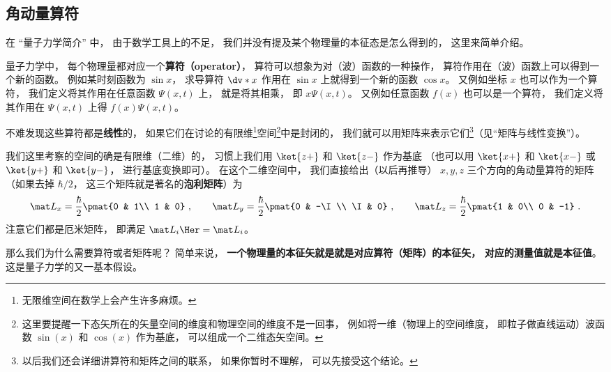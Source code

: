 {


\subsection{角动量算符}
在 “量子力学简介” 中， 由于数学工具上的不足， 我们并没有提及某个物理量的本征态是怎么得到的， 这里来简单介绍。

量子力学中， 每个物理量都对应一个\textbf{算符（operator）}， 算符可以想象为对（波）函数的一种操作， 算符作用在（波）函数上可以得到一个新的函数。 例如某时刻函数为 $\sin x$， 求导算符 $\dv*{x}$ 作用在 $\sin x$ 上就得到一个新的函数 $\cos x$。 又例如坐标 $x$ 也可以作为一个算符， 我们定义将其作用在任意函数 $\Psi(x, t)$ 上， 就是将其相乘， 即 $x\Psi(x, t)$。 又例如任意函数 $f(x)$ 也可以是一个算符， 我们定义将其作用在 $\Psi(x, t)$ 上得 $f(x)\Psi(x, t)$。

不难发现这些算符都是\textbf{线性}的， 如果它们在讨论的有限维\footnote{无限维空间在数学上会产生许多麻烦。}空间\footnote{这里要提醒一下态矢所在的矢量空间的维度和物理空间的维度不是一回事， 例如将一维（物理上的空间维度， 即粒子做直线运动）波函数 $\sin(x)$ 和 $\cos(x)$ 作为基底， 可以组成一个二维态矢空间。}中是封闭的， 我们就可以用矩阵来表示它们\footnote{以后我们还会详细讲算符和矩阵之间的联系， 如果你暂时不理解， 可以先接受这个结论。}（见“矩阵与线性变换”）。%

我们这里考察的空间的确是有限维（二维）的， 习惯上我们用 $\ket{z+}$ 和 $\ket{z-}$ 作为基底 （也可以用 $\ket{x+}$ 和 $\ket{x-}$ 或 $\ket{y+}$ 和 $\ket{y-}$， 进行基底变换即可）。 在这个二维空间中， 我们直接给出（以后再推导） $x, y, z$ 三个方向的角动量算符的矩阵（如果去掉 $\hbar/2$， 这三个矩阵就是著名的\textbf{泡利矩阵}）为
\begin{equation}
\mat L_x = \frac{\hbar}{2}\pmat{0 & 1\\ 1 & 0}~,
\qquad
\mat L_y = \frac{\hbar}{2}\pmat{0 & -\I \\ \I & 0}~,
\qquad
\mat L_z = \frac{\hbar}{2}\pmat{1 & 0\\ 0 & -1}~.
\end{equation}
注意它们都是厄米矩阵， 即满足 $\mat L_i\Her = \mat L_i$。%

那么我们为什么需要算符或者矩阵呢？ 简单来说， \textbf{一个物理量的本征矢就是就是对应算符（矩阵）的本征矢， 对应的测量值就是本征值}。 这是量子力学的又一基本假设。

}
